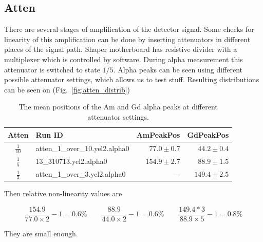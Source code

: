 \documentclass[a4paper]{article}
\begin{document}
\subsection{Atten}

There are several stages of amplification of the detector signal. Some checks
for linearity of this amplification can be done by inserting attenuators in
different places of the signal path. Shaper motherboard has resistive divider
with a multiplexer which is controlled by software. During alpha measurement
this attenuator is switched to state $1/5$. Alpha peaks can be seen using
different possible attenuator settings, which allows us to test stuff.
Resulting distributions can be seen on (Fig.~\ref{fig:atten_distrib})

\begin{table}[htb]
\caption{The mean positions of the Am and Gd alpha peaks at different attenuator settings.}
\centering

\begin{tabular}{clrr}
\toprule
Atten   &       Run ID & AmPeakPos      & GdPeakPos \\
\midrule
$\frac{1}{10}$  & \small{atten\_1\_over\_10.yel2.alpha0}        & $77.0\pm0.7$          & $44.2\pm0.4$ \\
\addlinespace
$\frac{1}{5}$   & \small{13\_310713.yel2.alpha0}                & $154.9\pm2.7$         & $88.9\pm1.5$ \\
\addlinespace
$\frac{1}{3}$   & \small{atten\_1\_over\_3.yel2.alpha0}         & ---\hspace{20pt}      & $149.4\pm2.5$ \\
\bottomrule
\end{tabular}

\label{table:atten}
\end{table}

Then relative non-linearity values are

\begin{equation}
\frac{154.9}{77.0 \times 2} - 1 = 0.6\%
\qquad
\frac{88.9}{44.0 \times 2} - 1 = 0.6\%
\qquad
\frac{149.4*3}{88.9 \times 5} - 1 = 0.8\%
\end{equation}

They are small enough.
\end{document}
